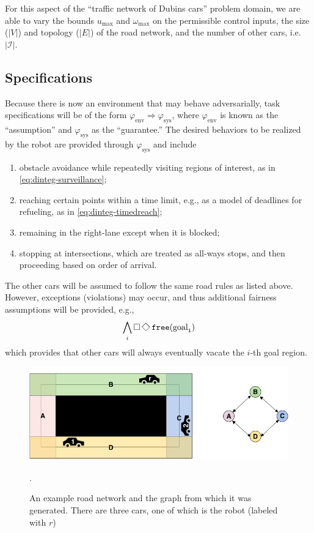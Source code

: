 \documentclass{amsart}
\theoremstyle{definition}
\begin{document}
For this aspect of the ``traffic network of Dubins cars'' problem domain, we are
able to vary the bounds $u_{\mathrm{max}}$ and $\omega_{\mathrm{max}}$ on the
permissible control inputs, the size ($|V|$) and topology ($|E|$) of the road
network, and the number of other cars, i.e. $|\mathcal I|$.


\subsection{Specifications}

Because there is now an environment that may behave adversarially, task
specifications will be of the form $\varphi_{\mathrm{env}} \Rightarrow
\varphi_{\mathrm{sys}}$, where $\varphi_{\mathrm{env}}$ is known as the
``assumption'' and $\varphi_{\mathrm{sys}}$ as the ``guarantee.''  The desired
behaviors to be realized by the robot are provided through
$\varphi_{\mathrm{sys}}$ and include
\begin{enumerate}
\item obstacle avoidance while repeatedly visiting regions of interest, as in
  \eqref{eq:dinteg-surveillance};

\item reaching certain points within a time limit, e.g., as a model of deadlines
  for refueling, as in \eqref{eq:dinteg-timedreach};

\item remaining in the right-lane except when it is blocked;

\item stopping at intersections, which are treated as all-ways stops, and then
  proceeding based on order of arrival.
\end{enumerate}
The other cars will be assumed to follow the same road rules as listed above.
However, exceptions (violations) may occur, and thus additional fairness
assumptions will be provided, e.g.,
\begin{equation}\label{eq:freegoals}
\bigwedge_i \Galways \Feventually \tt{free}(\mathrm{goal}_i)
\end{equation}
which provides that other cars will always eventually vacate the $i$-th goal
region.

\begin{figure}[h!]\label{fig:network}
  \centering
        \includegraphics[width=1.0\textwidth]{images/network}
  \caption{An example road network and the graph from which it was generated. There are three cars, one of which is the robot (labeled with $r$)}.
\end{figure}
\end{document}
